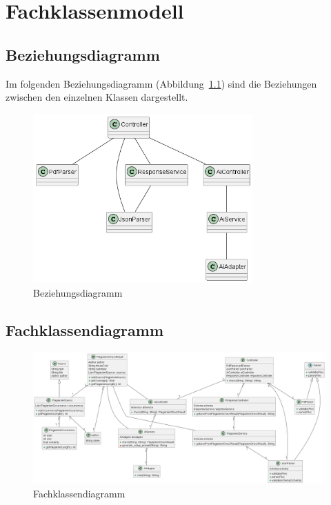 \chapter{Fachklassenmodell}\label{ch:fachklassenmodell}


\section{Beziehungsdiagramm}\label{sec:beziehungsdiagramm}
Im folgenden Beziehungsdiagramm (Abbildung~\ref{fig:beziehungsdiagramm}) sind die Beziehungen zwischen den einzelnen Klassen dargestellt.

\begin{figure}[H]
    \centering
    \includegraphics[width=0.75\textwidth]{images/diagrams/Beziehungsdiagramm}
    \caption{Beziehungsdiagramm}
    \label{fig:beziehungsdiagramm}
\end{figure}


\section{Fachklassendiagramm}\label{sec:fachklassendiagramm}
\begin{figure}[H]
    \centering
    \includegraphics[width=\textwidth]{images/diagrams/Klassendiagramm}
    \caption{Fachklassendiagramm}
    \label{fig:fachklassendiagramm}
\end{figure}



